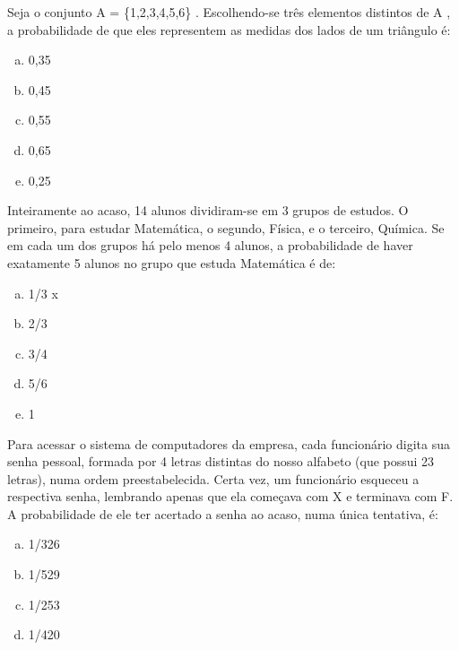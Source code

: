 \item Seja o conjunto A = \{1,2,3,4,5,6\} . Escolhendo-se três elementos distintos de A , a probabilidade de que eles representem as medidas dos lados de um triângulo é:
\begin{multicols}{5}
\begin{enumerate}[a)]
	\item 0,35
	\item 0,45
	\item 0,55
	\item 0,65 
	\item 0,25
\end{enumerate}
\end{multicols}

\item Inteiramente ao acaso, 14 alunos dividiram-se em 3 grupos de estudos. O primeiro, para estudar Matemática, o segundo, Física, e o terceiro, Química. Se em cada um dos grupos há pelo menos 4 alunos, a probabilidade de haver exatamente 5 alunos no grupo que estuda Matemática é de:
\begin{multicols}{5}
\begin{enumerate}[a)]
	\item 1/3  x
	\item 2/3
	\item 3/4
	\item 5/6
	\item 1
\end{enumerate}
\end{multicols}

\item Para acessar o sistema de computadores da empresa, cada funcionário digita sua senha pessoal, formada por 4 letras distintas do nosso alfabeto (que possui 23 letras), numa ordem preestabelecida. Certa vez, um funcionário esqueceu a respectiva senha, lembrando apenas que ela começava com X e terminava com F. A probabilidade de ele ter acertado a senha ao acaso, numa única tentativa, é:
\begin{multicols}{4}
\begin{enumerate}[a)]
	\item 1/326
	\item 1/529
	\item 1/253
	\item 1/420
\end{enumerate}
\end{multicols}

